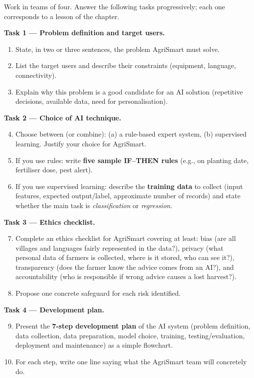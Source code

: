 \documentclass[11pt]{article}
\newcommand{\cle}[1]{{\popxbold\color{popdark}#1}}
\newcounter{popsec}
\newcounter{popsub}
\newcommand{\courssub}[1]{%
  \stepcounter{popsub}%
  \par\vspace{9pt}\noindent{\popxbold\fontsize{11.5}{13}\selectfont\color{popink}{\color{poporange}\thepopsec.\thepopsub}\hspace{6pt}#1}\par\nopagebreak\vspace{4pt}
}
\begin{document}
\courssub{Tasks}

Work in teams of four. Answer the following tasks progressively; each one corresponds to a lesson of the chapter.

\textbf{Task 1 — Problem definition and target users.}
\begin{enumerate}
\item State, in two or three sentences, the problem AgriSmart must solve.
\item List the target users and describe their constraints (equipment, language, connectivity).
\item Explain why this problem is a good candidate for an AI solution (repetitive decisions, available data, need for personalisation).
\end{enumerate}

\textbf{Task 2 — Choice of AI technique.}
\begin{enumerate}
\setcounter{enumi}{3}
\item Choose between (or combine): (a) a rule-based \cle{expert system}, (b) \cle{supervised learning}. Justify your choice for AgriSmart.
\item If you use rules: write \textbf{five sample IF–THEN rules} (e.g., on planting date, fertiliser dose, pest alert).
\item If you use supervised learning: describe the \textbf{training data} to collect (input features, expected output/label, approximate number of records) and state whether the main task is \emph{classification} or \emph{regression}.
\end{enumerate}

\textbf{Task 3 — Ethics checklist.}
\begin{enumerate}
\setcounter{enumi}{6}
\item Complete an ethics checklist for AgriSmart covering at least: \cle{bias} (are all villages and languages fairly represented in the data?), \cle{privacy} (what personal data of farmers is collected, where is it stored, who can see it?), \cle{transparency} (does the farmer know the advice comes from an AI?), and \cle{accountability} (who is responsible if wrong advice causes a lost harvest?).
\item Propose one concrete safeguard for each risk identified.
\end{enumerate}

\textbf{Task 4 — Development plan.}
\begin{enumerate}
\setcounter{enumi}{8}
\item Present the \textbf{7-step development plan} of the AI system (problem definition, data collection, data preparation, model choice, training, testing/evaluation, deployment and maintenance) as a simple flowchart.
\item For each step, write one line saying what the AgriSmart team will concretely do.
\end{enumerate}
\end{document}
